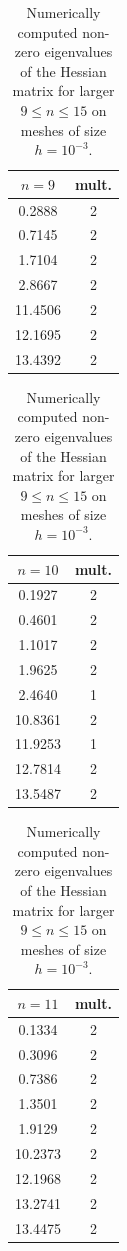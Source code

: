 \begin{table}
\smaller
\caption{Numerically computed non-zero eigenvalues of the Hessian matrix for larger $9\leq n \leq 15$ on meshes of size $h=10^{-3}$.}
\label{tab:eig-numeric}
\centering
\raisebox{25pt}
{\begin{minipage}{.2\textwidth}
\begin{tabular}{|c|c|}
\hline
$n = 9$ & mult.\\ \hline
0.2888 & 2\\
0.7145 & 2\\
1.7104 & 2\\
2.8667 & 2\\
11.4506 & 2\\
12.1695 & 2\\
13.4392 & 2\\
\hline
\end{tabular}
\end{minipage}}
\raisebox{12.5pt}
{\begin{minipage}{.2\textwidth}
\begin{tabular}{|c|c|}
\hline
$n = 10$ & mult.\\ \hline
0.1927 & 2\\
0.4601 & 2\\
1.1017 & 2\\
1.9625 & 2\\
2.4640 & 1\\
10.8361 & 2\\
11.9253 & 1\\
12.7814 & 2\\
13.5487 & 2\\
\hline
\end{tabular}
\end{minipage}}
\raisebox{12.5pt}
{\begin{minipage}{.2\textwidth}
\begin{tabular}{|c|c|}
\hline
$n = 11$ & mult.\\ \hline
0.1334 & 2\\
0.3096& 2\\
0.7386& 2\\
1.3501& 2\\
1.9129& 2\\
10.2373& 2\\
12.1968& 2\\
13.2741& 2\\
13.4475& 2\\
\hline
\end{tabular}
\end{minipage}}
\begin{minipage}{.2\textwidth}

\end{minipage}
\end{table}

